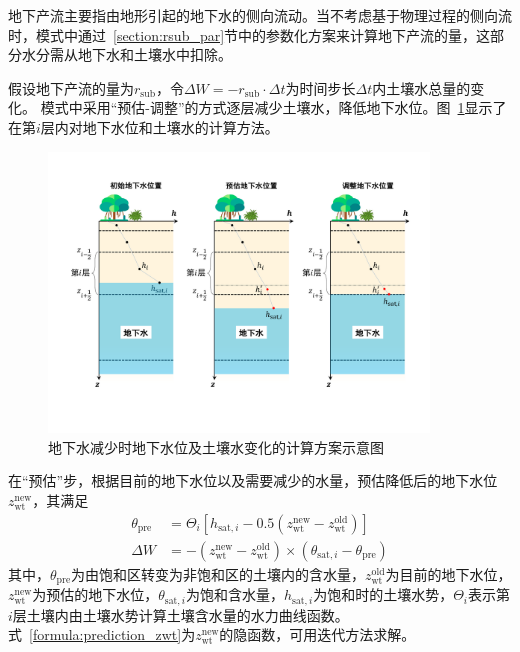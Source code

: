 地下产流主要指由地形引起的地下水的侧向流动。当不考虑基于物理过程的侧向流时，模式中通过~\ref{section:rsub_par}节中的参数化方案来计算地下产流的量，这部分水分需从地下水和土壤水中扣除。

假设地下产流的量为$r_{\mathrm{sub}}$，令$\Delta W=-r_{\mathrm{sub}}\cdot \Delta t$为时间步长$\Delta t$内土壤水总量的变化。 模式中采用“预估-调整”的方式逐层减少土壤水，降低地下水位。图~\ref{fig:地下水变化}显示了在第$i$层内对地下水位和土壤水的计算方法。

{
  \begin{figure}[htbp]
    \centering
    \includegraphics[width=0.9\textwidth]{Figures/植被冠层和土壤水分/地下水变化.pdf}
    \caption{地下水减少时地下水位及土壤水变化的计算方案示意图}
    \label{fig:地下水变化}
  \end{figure}
}

在“预估”步，根据目前的地下水位以及需要减少的水量，预估降低后的地下水位$z_{\mathrm{wt}}^{\mathrm{new}}$，其满足
\begin{equation} \label{formula:prediction_zwt}
  \begin{aligned}
    \theta_{\mathrm{pre}} & = \Theta_i\left[h_{\mathrm{sat},i} - 0.5\left(z_{\mathrm{wt}}^{\mathrm{new}} - z_{\mathrm{wt}}^{\mathrm{old}}\right)\right] \\
    \Delta W & = - \left(z_{\mathrm{wt}}^{\mathrm{new}} - z_{\mathrm{wt}}^{\mathrm{old}}\right) \times  \left(\theta_{\mathrm{sat},i} - \theta_{\mathrm{pre}}\right)
  \end{aligned}
\end{equation}
其中，$\theta_{\mathrm{pre}}$为由饱和区转变为非饱和区的土壤内的含水量，$z_{\mathrm{wt}}^{\mathrm{old}}$为目前的地下水位，$z_{\mathrm{wt}}^{\mathrm{new}}$为预估的地下水位，$\theta_{\mathrm{sat},i}$为饱和含水量，$h_{\mathrm{sat},i}$为饱和时的土壤水势，$\Theta_i$表示第$i$层土壤内由土壤水势计算土壤含水量的水力曲线函数。式~\eqref{formula:prediction_zwt}为$z_{\mathrm{wt}}^{\mathrm{new}}$的隐函数，可用迭代方法求解。

